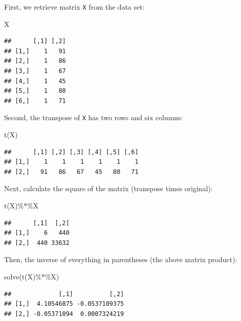\documentclass[
]{book}
\newenvironment{Shaded}{\begin{snugshade}}{\end{snugshade}}
\newcommand{\FunctionTok}[1]{\textcolor[rgb]{0.00,0.00,0.00}{#1}}
\newcommand{\NormalTok}[1]{#1}
\newcommand{\SpecialCharTok}[1]{\textcolor[rgb]{0.00,0.00,0.00}{#1}}
\begin{document}
First, we retrieve matrix \texttt{X} from the data set:

\begin{Shaded}
\begin{Highlighting}[]
\NormalTok{X}
\end{Highlighting}
\end{Shaded}

\begin{verbatim}
##      [,1] [,2]
## [1,]    1   91
## [2,]    1   86
## [3,]    1   67
## [4,]    1   45
## [5,]    1   80
## [6,]    1   71
\end{verbatim}

Second, the transpose of \texttt{X} has two rows and six columns:

\begin{Shaded}
\begin{Highlighting}[]
\FunctionTok{t}\NormalTok{(X)}
\end{Highlighting}
\end{Shaded}

\begin{verbatim}
##      [,1] [,2] [,3] [,4] [,5] [,6]
## [1,]    1    1    1    1    1    1
## [2,]   91   86   67   45   80   71
\end{verbatim}

Next, calculate the square of the matrix (transpose times original):

\begin{Shaded}
\begin{Highlighting}[]
\FunctionTok{t}\NormalTok{(X)}\SpecialCharTok{\%*\%}\NormalTok{X}
\end{Highlighting}
\end{Shaded}

\begin{verbatim}
##      [,1]  [,2]
## [1,]    6   440
## [2,]  440 33632
\end{verbatim}

Then, the inverse of everything in parentheses (the above matrix product):

\begin{Shaded}
\begin{Highlighting}[]
\FunctionTok{solve}\NormalTok{(}\FunctionTok{t}\NormalTok{(X)}\SpecialCharTok{\%*\%}\NormalTok{X)}
\end{Highlighting}
\end{Shaded}

\begin{verbatim}
##             [,1]          [,2]
## [1,]  4.10546875 -0.0537109375
## [2,] -0.05371094  0.0007324219
\end{verbatim}
\end{document}

